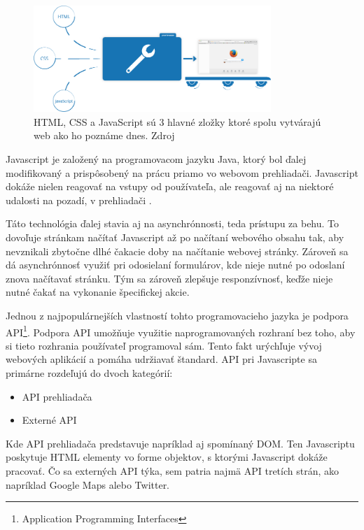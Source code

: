 \newpage
\begin{figure}[hbt]
	\centering
	\includegraphics[width=0.8\textwidth]{obrazky-figures/jsexecution.png}
	\caption{HTML, CSS a JavaScript sú 3 hlavné zložky ktoré spolu vytvárajú web ako ho poznáme dnes. Zdroj \cite{Javascript}}
	\label{Jsexecution_img}
\end{figure}

\bigskip

Javascript je založený na programovacom jazyku Java, ktorý bol ďalej modifikovaný a prispôsobený na prácu priamo vo webovom prehliadači. Javascript dokáže nielen reagovať na vstupy od používateľa, ale reagovať aj na niektoré udalosti na pozadí, v prehliadači \cite{Javascript}. 

Táto technológia ďalej stavia aj na asynchrónnosti, teda prístupu za behu. To dovoľuje stránkam načítať Javascript až po načítaní webového obsahu tak, aby nevznikali zbytočne dlhé čakacie doby na načítanie webovej stránky. Zároveň sa dá asynchrónnosť využiť pri odosielaní formulárov, kde nieje nutné po odoslaní znova načítavať stránku. Tým sa zároveň zlepšuje responzívnosť, keďže nieje nutné čakať na vykonanie špecifickej akcie. 

Jednou z najpopulárnejších vlastností tohto programovacieho jazyka je podpora API\footnote{Application Programming Interfaces}. Podpora API umožňuje využitie naprogramovaných rozhraní bez toho, aby si tieto rozhrania používateľ programoval sám. Tento fakt urýchľuje vývoj webových aplikácií a pomáha udržiavať štandard. API pri Javascripte sa primárne rozdeľujú do dvoch kategórií:

\begin{itemize}
    \item {API prehliadača}
    \item {Externé API}
\end{itemize}

Kde API prehliadača predstavuje napríklad aj spomínaný DOM. Ten Javascriptu poskytuje HTML elementy vo forme objektov, s ktorými Javascript dokáže pracovať. Čo sa externých API týka, sem patria najmä API tretích strán, ako napríklad Google Maps alebo Twitter.

